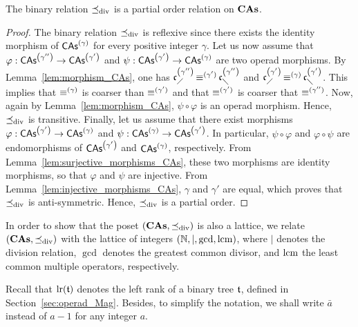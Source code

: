 \begin{Proposition}\label{prop:poset_CAs}
    The binary relation $\preceq_{\mathrm{div}}$ is a partial order relation on
    $\mathbf{CAs}$.
\end{Proposition}
\begin{proof}
    The binary relation $\preceq_{\mathrm{div}}$ is reflexive since there exists the
    identity morphism of $\mathsf{CAs}^{\left(\gamma\right)}$ for every positive integer
    $\gamma$. Let us now assume that
    $\varphi:\mathsf{CAs}^{\left(\gamma''\right)} \to \mathsf{CAs}^{\left(\gamma'\right)}$ and
    $\psi:\mathsf{CAs}^{\left(\gamma'\right)} \to \mathsf{CAs}^{\left(\gamma\right)}$ are two operad morphisms. By
    Lemma~\ref{lem:morphism_CAs}, one has
    $\mathfrak{c}^{\left(\gamma''\right)}_{\diagup} \operatorname{\equiv}^{(\gamma')} \mathfrak{c}^{\left(\gamma''\right)}_{\diagdown}$ and
    $\mathfrak{c}^{\left(\gamma'\right)}_{\diagup} \operatorname{\equiv}^{(\gamma)} \mathfrak{c}^{\left(\gamma'\right)}_{\diagdown}$. This implies
    that $\operatorname{\equiv}^{(\gamma)}$ is coarser than $\operatorname{\equiv}^{(\gamma')}$ and
    that $\operatorname{\equiv}^{(\gamma')}$ is coarser that $\operatorname{\equiv}^{(\gamma'')}$. Now,
    again by Lemma~\ref{lem:morphism_CAs}, $\psi \circ \varphi$ is an
    operad morphism. Hence, $\preceq_{\mathrm{div}}$ is transitive. Finally, let us
    assume that there exist morphisms
    $\varphi:\mathsf{CAs}^{\left(\gamma'\right)}\to\mathsf{CAs}^{\left(\gamma\right)}$ and
    $\psi:\mathsf{CAs}^{\left(\gamma\right)}\to\mathsf{CAs}^{\left(\gamma'\right)}$. In particular,
    $\psi \circ \varphi$ and $\varphi \circ \psi$ are endomorphisms of
    $\mathsf{CAs}^{\left(\gamma'\right)}$ and $\mathsf{CAs}^{\left(\gamma\right)}$, respectively. From
    Lemma~\ref{lem:surjective_morphisms_CAs}, these two morphisms are
    identity morphisms, so that $\varphi$ and $\psi$ are injective. From
    Lemma~\ref{lem:injective_morphisms_CAs}, $\gamma$ and $\gamma'$ are
    equal, which proves that $\preceq_{\mathrm{div}}$ is anti-symmetric. Hence,
    $\preceq_{\mathrm{div}}$ is a partial order.
\end{proof}
\medbreak

In order to show that the poset $\left(\mathbf{CAs}, \preceq_{\mathrm{div}}\right)$ is also a
lattice, we relate $\left(\mathbf{CAs}, \preceq_{\mathrm{div}}\right)$ with the lattice of
integers $\left(\mathbb{N},\mid, \gcd, \operatorname{lcm}\right)$, where $\mid$ denotes the
division relation, $\gcd$ denotes the greatest common divisor, and
$\operatorname{lcm}$ the least common multiple operators, respectively.

Recall that
$\mathrm{lr}(\mathfrak{t})$ denotes the left rank of a binary tree $\mathfrak{t}$, defined in
Section~\ref{sec:operad_Mag}. Besides, to simplify the notation,
we shall write $\bar{a}$ instead of $a - 1$ for any integer $a$.
\medbreak

